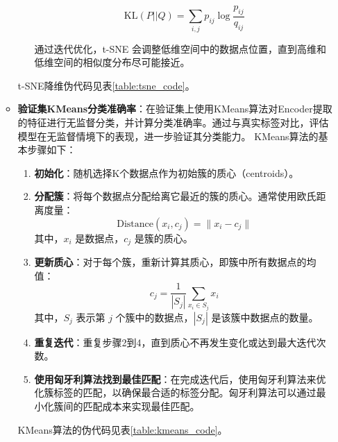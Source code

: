 \documentclass[master]{thesis-uestc}
\begin{document}
\begin{itemize}
\begin{itemize}
\begin{enumerate}
            \begin{equation}
            \text{KL}(P || Q) = \sum_{i,j} p_{ij} \log \frac{p_{ij}}{q_{ij}}
            \end{equation}
            
            通过迭代优化，t-SNE 会调整低维空间中的数据点位置，直到高维和低维空间的相似度分布尽可能接近。
        \end{enumerate}
        t-SNE降维伪代码见表\ref{table:tsne_code}。

          \item \textbf{验证集KMeans分类准确率}：在验证集上使用KMeans算法对Encoder提取的特征进行无监督分类，并计算分类准确率。通过与真实标签对比，评估模型在无监督情境下的表现，进一步验证其分类能力。
            KMeans算法的基本步骤如下：

            \begin{enumerate}
                \item \textbf{初始化}：随机选择K个数据点作为初始簇的质心（centroids）。
                \item \textbf{分配簇}：将每个数据点分配给离它最近的簇的质心。通常使用欧氏距离度量：
                \[
                \text{Distance}(x_i, c_j) = \| x_i - c_j \|
                \]
                其中，\(x_i\) 是数据点，\(c_j\) 是簇的质心。
                \item \textbf{更新质心}：对于每个簇，重新计算其质心，即簇中所有数据点的均值：
                \[
                c_j = \frac{1}{|S_j|} \sum_{x_i \in S_j} x_i
                \]
                其中，\(S_j\) 表示第 \(j\) 个簇中的数据点，\(|S_j|\) 是该簇中数据点的数量。
                \item \textbf{重复迭代}：重复步骤2到4，直到质心不再发生变化或达到最大迭代次数。
                \item \textbf{使用匈牙利算法找到最佳匹配}：在完成迭代后，使用匈牙利算法来优化簇标签的匹配，以确保最合适的标签分配。匈牙利算法可以通过最小化簇间的匹配成本来实现最佳匹配。
            \end{enumerate}
            KMeans算法的伪代码见表\ref{table:kmeans_code}。
      \end{itemize}      
\end{itemize}
\end{document}
